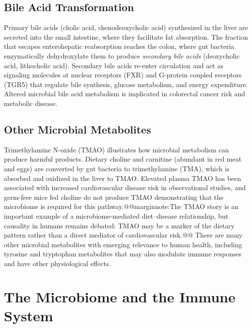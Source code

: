 \documentclass{tufte-handout}
\makeatletter
\def\marginnote#1{@@marginnote:#1@@}
\makeatother
\begin{document}
\subsection{Bile Acid Transformation}

Primary bile acids (cholic acid, chenodeoxycholic acid) synthesized in the liver are secreted into the small intestine, where they facilitate fat absorption. The fraction that escapes enterohepatic reabsorption reaches the colon, where gut bacteria enzymatically dehydroxylate them to produce \emph{secondary bile acids} (deoxycholic acid, lithocholic acid). Secondary bile acids re-enter circulation and act as signaling molecules at nuclear receptors (FXR) and G-protein coupled receptors (TGR5) that regulate bile synthesis, glucose metabolism, and energy expenditure. Altered microbial bile acid metabolism is implicated in colorectal cancer risk and metabolic disease.

\subsection{Other Microbial Metabolites}

Trimethylamine N-oxide (TMAO) illustrates how microbial metabolism can produce harmful products. Dietary choline and carnitine (abundant in red meat and eggs) are converted by gut bacteria to trimethylamine (TMA), which is absorbed and oxidized in the liver to TMAO. Elevated plasma TMAO has been associated with increased cardiovascular disease risk in observational studies, and germ-free mice fed choline do not produce TMAO demonstrating that the microbiome is required for this pathway.\marginnote{The TMAO story is an important example of a microbiome-mediated diet--disease relationship, but causality in humans remains debated: TMAO may be a marker of the dietary pattern rather than a direct mediator of cardiovascular risk.} There are many other microbial metabolites with emerging relevance to human health, including tyrosine and tryptophan metabolites that may also modulate immune responses and have other physiological effects.

\section{The Microbiome and the Immune System}
\end{document}
